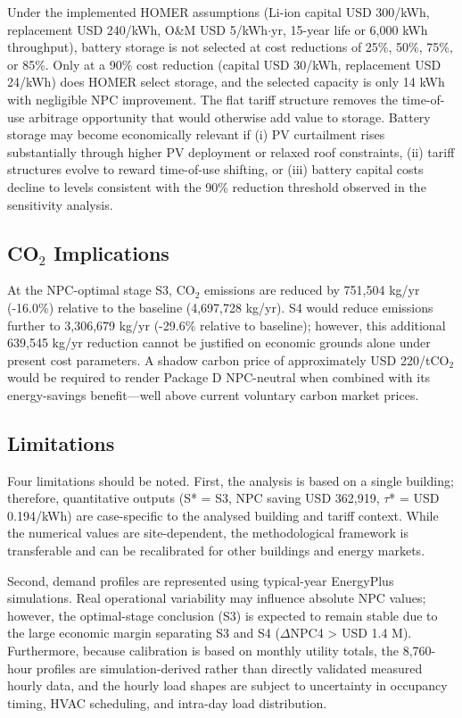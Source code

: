 \documentclass[journal,fleqn]{IEEEtran}
\begin{document}
Under the implemented HOMER assumptions (Li-ion capital USD 300/kWh, replacement USD 240/kWh, O\&M USD 5/kWh$\cdot$yr, 15-year life or 6,000 kWh throughput), battery storage is not selected at cost reductions of 25\%, 50\%, 75\%, or 85\%. Only at a 90\% cost reduction (capital USD 30/kWh, replacement USD 24/kWh) does HOMER select storage, and the selected capacity is only 14 kWh with negligible NPC improvement. The flat tariff structure removes the time-of-use arbitrage opportunity that would otherwise add value to storage. Battery storage may become economically relevant if (i) PV curtailment rises substantially through higher PV deployment or relaxed roof constraints, (ii) tariff structures evolve to reward time-of-use shifting, or (iii) battery capital costs decline to levels consistent with the 90\% reduction threshold observed in the sensitivity analysis.


\subsection{CO$_{2}$ Implications}

At the NPC-optimal stage S3, CO$_{2}$ emissions are reduced by 751,504 kg/yr (-16.0\%) relative to the baseline (4,697,728 kg/yr). S4 would reduce emissions further to 3,306,679 kg/yr (-29.6\% relative to baseline); however, this additional 639,545 kg/yr reduction cannot be justified on economic grounds alone under present cost parameters. A shadow carbon price of approximately USD 220/tCO$_{2}$ would be required to render Package D NPC-neutral when combined with its energy-savings benefit---well above current voluntary carbon market prices.


\subsection{Limitations}

Four limitations should be noted. First, the analysis is based on a single building; therefore, quantitative outputs (S* = S3, NPC saving USD 362,919, $\tau$* = USD 0.194/kWh) are case-specific to the analysed building and tariff context. While the numerical values are site-dependent, the methodological framework is transferable and can be recalibrated for other buildings and energy markets.


Second, demand profiles are represented using typical-year EnergyPlus simulations. Real operational variability may influence absolute NPC values; however, the optimal-stage conclusion (S3) is expected to remain stable due to the large economic margin separating S3 and S4 ($\Delta$NPC4 > USD 1.4 M). Furthermore, because calibration is based on monthly utility totals, the 8,760-hour profiles are simulation-derived rather than directly validated measured hourly data, and the hourly load shapes are subject to uncertainty in occupancy timing, HVAC scheduling, and intra-day load distribution.
\end{document}
